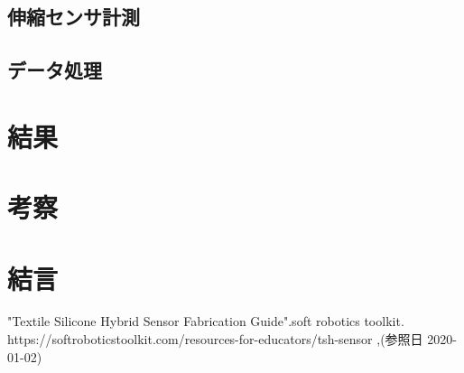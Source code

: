 \subsection{伸縮センサ計測}

\subsection{データ処理}

\section{結果}

\section{考察}

\section{結言}

\small
\begin{thebibliography}{99}
 "Textile Silicone Hybrid Sensor Fabrication Guide".soft robotics toolkit. \newline https://softroboticstoolkit.com/resources-for-educators/tsh-sensor ,(参照日 2020-01-02)
\end{thebibliography}
\normalsize
